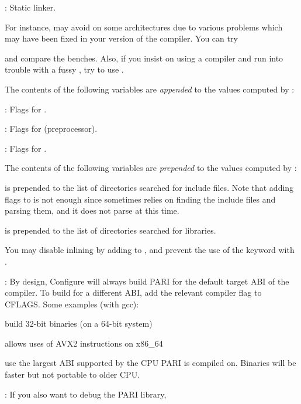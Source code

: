 : Static linker.

\noindent For instance,  may avoid  on some
architectures due to various problems which may have been fixed in your
version of the compiler. You can try


\noindent and compare the benches. Also, if you insist on using a 
compiler and run into trouble with a fussy , try to use
.

\noindent The contents of the following variables are \emph{appended} to the
values computed by :

: Flags for .

: Flags for  (preprocessor).

: Flags for .

\noindent The contents of the following variables are \emph{prepended} to
the values computed by :

 is prepended to the list of directories
searched for include files. Note that adding  flags to
 is not enough since  sometimes
relies on finding the include files and parsing them, and it does not
parse  at this time.

 is prepended to the list of directories
searched for libraries.

\noindent You may disable inlining by adding  to
, and prevent the use of the  keyword with
.

: By design, Configure will always build PARI for
the default target ABI of the compiler. To build for a different ABI, add
the relevant compiler flag to CFLAGS. Some examples (with gcc):

 build 32-bit binaries (on a 64-bit system)

 allows uses of AVX2 instructions on x86\_64

 use the largest ABI supported by the CPU PARI
is compiled on. Binaries will be faster but not portable to older CPU.

: If you also want to debug the PARI library,


